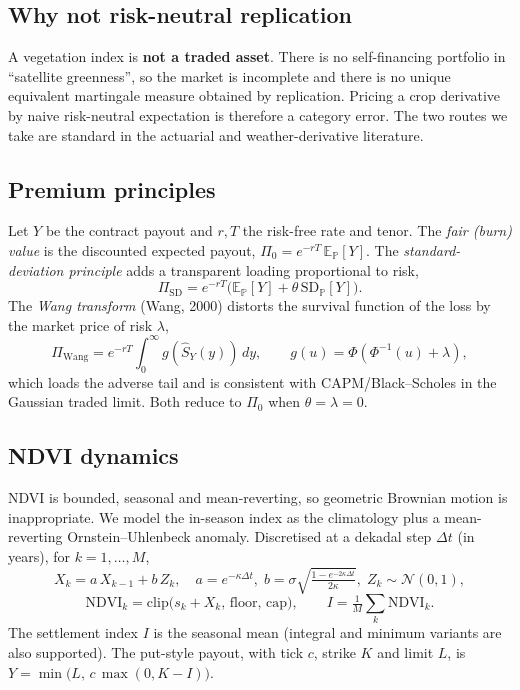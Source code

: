 \documentclass[11pt]{article}
\begin{document}
\subsection{Why not risk-neutral replication}
A vegetation index is \textbf{not a traded asset}. There is no self-financing
portfolio in ``satellite greenness'', so the market is incomplete and there is no
unique equivalent martingale measure obtained by replication. Pricing a crop
derivative by naive risk-neutral expectation is therefore a category error. The
two routes we take are standard in the actuarial and weather-derivative
literature.

\subsection{Premium principles}
Let $Y$ be the contract payout and $r,T$ the risk-free rate and tenor. The
\emph{fair (burn) value} is the discounted expected payout,
$\Pi_0=e^{-rT}\,\mathbb{E}_{\mathbb P}[Y]$. The \emph{standard-deviation
principle} adds a transparent loading proportional to risk,
\begin{equation}
\Pi_{\text{SD}}=e^{-rT}\bigl(\mathbb{E}_{\mathbb P}[Y]+\theta\,\mathrm{SD}_{\mathbb P}[Y]\bigr).
\end{equation}
The \emph{Wang transform} (Wang, 2000) distorts the survival function of the loss
by the market price of risk $\lambda$,
\begin{equation}
\Pi_{\text{Wang}}=e^{-rT}\!\int_0^{\infty} g\!\left(\widehat S_Y(y)\right)\,dy,
\qquad g(u)=\Phi\!\left(\Phi^{-1}(u)+\lambda\right),
\end{equation}
which loads the adverse tail and is consistent with CAPM/Black--Scholes in the
Gaussian traded limit. Both reduce to $\Pi_0$ when $\theta=\lambda=0$.

\subsection{NDVI dynamics}
NDVI is bounded, seasonal and mean-reverting, so geometric Brownian motion is
inappropriate. We model the in-season index as the climatology plus a
mean-reverting Ornstein--Uhlenbeck anomaly. Discretised at a dekadal step
$\Delta t$ (in years), for $k=1,\dots,M$,
\begin{equation}
X_k=a\,X_{k-1}+b\,Z_k,\quad
a=e^{-\kappa\Delta t},\;
b=\sigma\sqrt{\tfrac{1-e^{-2\kappa\Delta t}}{2\kappa}},\;
Z_k\sim\mathcal N(0,1),
\end{equation}
\begin{equation}
\text{NDVI}_k=\mathrm{clip}\bigl(s_k+X_k,\,\text{floor},\,\text{cap}\bigr),\qquad
I=\tfrac1M\textstyle\sum_k \text{NDVI}_k .
\end{equation}
The settlement index $I$ is the seasonal mean (integral and minimum variants are
also supported). The put-style payout, with tick $c$, strike $K$ and limit $L$, is
$Y=\min\!\bigl(L,\,c\,\max(0,K-I)\bigr)$.
\end{document}

